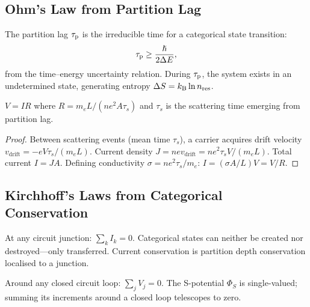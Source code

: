 \subsection{Ohm's Law from Partition Lag}

\begin{definition}
  The partition lag $\tau_{\mathrm{p}}$ is the irreducible time for a categorical state
  transition:
  \begin{equation}
    \tau_{\mathrm{p}} \geq \frac{\hslash}{2\Delta E},
  \end{equation}
  from the time--energy uncertainty relation.  During $\tau_{\mathrm{p}}$, the system
  exists in an undetermined state, generating entropy $\Delta S = k_{\mathrm{B}}\ln
  n_{\mathrm{res}}$.
\end{definition}

\begin{theorem}
\label{thm:ch21-ohm}
  $V = IR$ where $R = m_e L/(ne^2 A\tau_s)$ and $\tau_s$ is the scattering
  time emerging from partition lag.
\end{theorem}

\begin{proof}
  Between scattering events (mean time $\tau_s$), a carrier acquires drift
  velocity $v_{\mathrm{drift}} = -eV\tau_s/(m_e L)$.  Current density
  $J = nev_{\mathrm{drift}} = ne^2\tau_s V/(m_e L)$.  Total current
  $I = JA$.  Defining conductivity $\sigma = ne^2\tau_s/m_e$: $I =
  (\sigma A/L)V = V/R$.
\end{proof}

\subsection{Kirchhoff's Laws from Categorical Conservation}

\begin{theorem}
  At any circuit junction: $\sum_k I_k = 0$.  Categorical states can
  neither be created nor destroyed---only transferred.  Current conservation
  is partition depth conservation localised to a junction.
\end{theorem}

\begin{theorem}
  Around any closed circuit loop: $\sum_j V_j = 0$.  The S-potential
  $\Phi_S$ is single-valued; summing its increments around a closed loop
  telescopes to zero.
\end{theorem}

